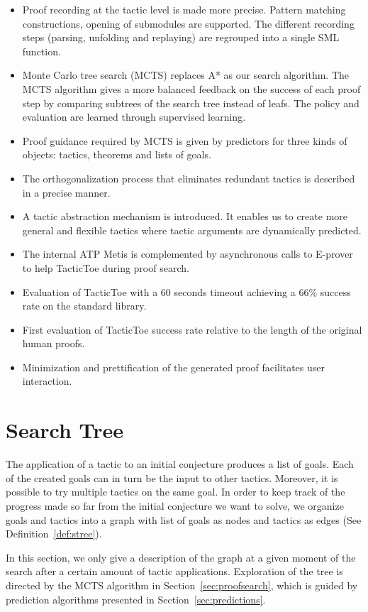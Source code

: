 \documentclass[runningheads,a4paper,draft]{svjour3}
\def\eprover{\textsf{E-prover}\xspace}
\def\sml{\textsf{SML}\xspace}
\def\metis{\textsf{Metis}\xspace}
\def\tactictoe{\textsf{TacticToe}\xspace}
\begin{document}
\begin{itemize}
\item Proof recording at the tactic level is made more precise. Pattern
matching constructions, opening of submodules are supported. The different
recording steps (parsing, unfolding and replaying) are regrouped into a single
\sml function.
\item Monte Carlo tree search (MCTS) replaces A* as our
search algorithm. The MCTS algorithm gives a more balanced feedback on
the success of
each proof step by
comparing subtrees of the search tree instead of leafs. The policy and
evaluation are learned
through supervised learning.
\item Proof guidance required by MCTS is given by predictors for
three kinds of objects: tactics, theorems and lists of goals.
\item The orthogonalization process that eliminates redundant tactics is
described in a precise manner.
\item A tactic abstraction mechanism is introduced. It enables us to create
more general and flexible tactics where tactic arguments are dynamically
predicted.
\item The internal ATP \metis is complemented
by asynchronous calls to \eprover to help \tactictoe during proof search.
\item Evaluation of \tactictoe with a 60 seconds timeout achieving a 66\%
success rate on the standard library.
\item First evaluation of \tactictoe success rate relative to
the length of the original human proofs.
\item Minimization and prettification of the generated proof  facilitates user
interaction.
\end{itemize}


\section{Search Tree}\label{sec:prelim}
The application of a tactic to an initial conjecture produces a list of goals.
Each of the created goals can in turn be the input to other tactics.
Moreover, it is possible to try multiple tactics on the same goal.
In order to keep track of the progress made so far from the initial conjecture
we want to solve, we organize goals and tactics into a graph with list of goals
as nodes and tactics as edges (See Definition~\ref{def:stree}).

In this section, we only give a description of the graph at a given
moment of the search after a certain amount of tactic applications.
Exploration of the tree is directed by the MCTS algorithm in
Section~\ref{sec:proofsearch}, which is guided by prediction algorithms
presented in Section~\ref{sec:predictions}.
\end{document}
